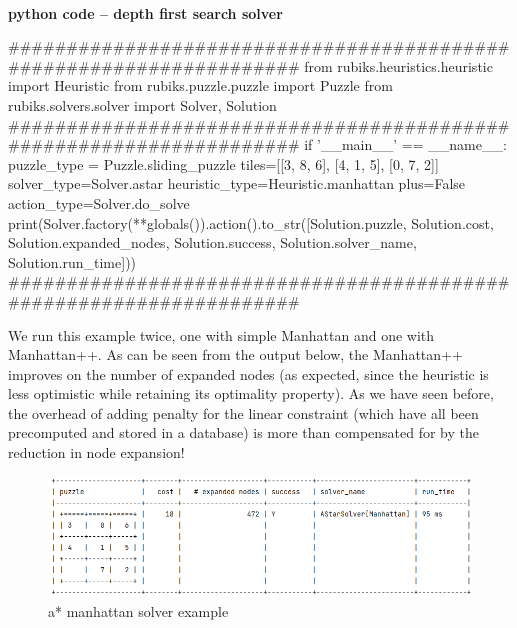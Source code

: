 \paragraph{}{\textbf{python code -- depth first search solver}}
\begin{python}
####################################################################
from rubiks.heuristics.heuristic import Heuristic
from rubiks.puzzle.puzzle import Puzzle
from rubiks.solvers.solver import Solver, Solution
####################################################################
if '__main__' == __name__:
    puzzle_type = Puzzle.sliding_puzzle
    tiles=[[3, 8, 6], [4, 1, 5], [0, 7, 2]]
    solver_type=Solver.astar
    heuristic_type=Heuristic.manhattan
    plus=False
    action_type=Solver.do_solve
    print(Solver.factory(**globals()).action().to_str([Solution.puzzle,
                                                       Solution.cost,
                                                       Solution.expanded_nodes,
                                                       Solution.success,
                                                       Solution.solver_name,
                                                       Solution.run_time]))
####################################################################
\end{python}
\black
We run this example twice, one with simple Manhattan and one with Manhattan++. As can be seen from the output below, the Manhattan++ improves on the number of expanded nodes (as expected, since the heuristic is less optimistic while retaining its optimality property). As we have seen before, the overhead of adding penalty for the linear constraint (which have all been precomputed and stored in a database) is more than compensated for by the reduction in node expansion!

\begin{figure}[H]
\centering
\includegraphics[scale=0.39]{./Figures/exampleastarmanhattansolver}
\caption[Examples]{a* manhattan solver example}
\label{fig:exampleastarmanhattansolver}
\end{figure}

